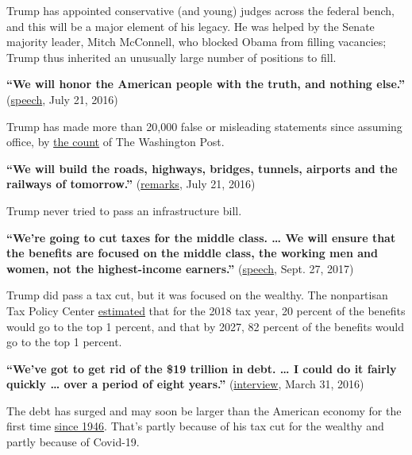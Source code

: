 Trump has appointed conservative (and young) judges across the federal
bench, and this will be a major element of his legacy. He was helped by
the Senate majority leader, Mitch McConnell, who blocked Obama from
filling vacancies; Trump thus inherited an unusually large number of
positions to fill.

\textbf{``We will honor the American people with the truth, and nothing
else.''}
(\href{https://www.nytimes3xbfgragh.onion/2016/07/22/us/politics/trump-transcript-rnc-address.html}{speech},
July 21, 2016)

Trump has made more than 20,000 false or misleading statements since
assuming office, by
\href{https://www.washingtonpost.com/politics/2020/07/13/president-trump-has-made-more-than-20000-false-or-misleading-claims/}{the
count} of The Washington Post.

\textbf{``We will build the roads, highways, bridges, tunnels, airports
and the railways of tomorrow.''}
(\href{https://www.whitehouse.gov/briefings-statements/remarks-president-trump-tax-reform-event/}{remarks},
July 21, 2016)

Trump never tried to pass an infrastructure bill.

\textbf{``We're going to cut taxes for the middle class. \ldots{} We
will ensure that the benefits are focused on the middle class, the
working men and women, not the highest-income earners.''}
(\href{https://www.whitehouse.gov/briefings-statements/remarks-president-trump-tax-reform-event/}{speech},
Sept. 27, 2017)

Trump did pass a tax cut, but it was focused on the wealthy. The
nonpartisan Tax Policy Center
\href{https://www.washingtonpost.com/politics/2018/11/14/does-trump-tax-cut-give-percent-benefits-top-one-percent/}{estimated}
that for the 2018 tax year, 20 percent of the benefits would go to the
top 1 percent, and that by 2027, 82 percent of the benefits would go to
the top 1 percent.

\textbf{``We've got to get rid of the \$19 trillion in debt. \ldots{} I
could do it fairly quickly \ldots{} over a period of eight years.''}
(\href{https://www.washingtonpost.com/news/fact-checker/wp/2016/04/02/trumps-nonsensical-claim-he-can-eliminate-19-trillion-in-debt-in-eight-years/}{interview},
March 31, 2016)

The debt has surged and may soon be larger than the American economy for
the first time
\href{https://www.nytimes3xbfgragh.onion/2020/09/02/business/us-federal-debt.html}{since
1946}. That's partly because of his tax cut for the wealthy and partly
because of Covid-19.

